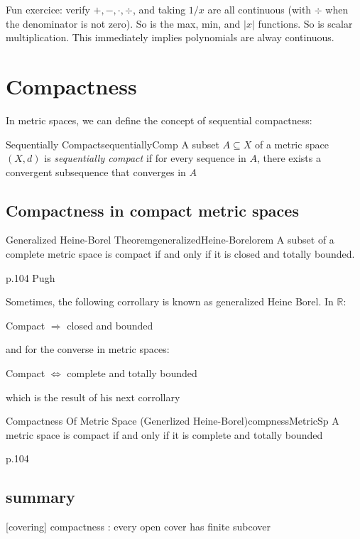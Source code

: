 \documentclass{book}
\newcommand{\R}{{\mathbb{R}}}
\newcommand{\sse}{\subseteq}
\newcommand{\Rw}{\Rightarrow}
\newcommand{\LRw}{\Leftrightarrow}
\newenvironment{Proof}[1][]
  {\begin{ProofTcb}[#1]}
  {\end{ProofTcb}}
\begin{document}
Fun exercice: verify $+, -, \cdot, \div$, and taking $1/x$ are all continuous (with $\div$ when the denominator is not
zero). So is the max, min, and $|x|$ functions. So is scalar multiplication. This immediately implies polynomials are
alway continuous.


\section{Compactness}


In metric spaces, we can define the concept of sequential compactness:
\begin{defn}{Sequentially Compact}{sequentiallyComp}
	A subset $A \sse X$ of a metric space $(X,d)$ is \emph{sequentially compact} if for every sequence in $A$, there
	exists a convergent subsequence that converges in $A$
\end{defn}

\subsection{Compactness in compact metric spaces}

\begin{thm}{Generalized Heine-Borel Theorem}{generalizedHeine-Borelorem}
	A subset of a complete metric space is compact if and only if it is closed and totally bounded.
\end{thm}

\begin{Proof}
	p.104 Pugh
\end{Proof}

Sometimes, the following corrollary is known as generalized Heine Borel. In $\R$:
\begin{center}
	Compact $\Rw$ closed and bounded
\end{center}
and for the converse in metric spaces:
\begin{center}
	Compact $\LRw$ complete and totally bounded
\end{center}
which is the result of his next corrollary
\begin{cor}{Compactness Of Metric Space (Generlized Heine-Borel)}{compnessMetricSp}
	A metric space is compact if and only if it is complete and totally bounded
\end{cor}

\begin{Proof}
	p.104
\end{Proof}

\subsection*{summary}
[covering] compactness : every open cover has finite subcover
\end{document}
